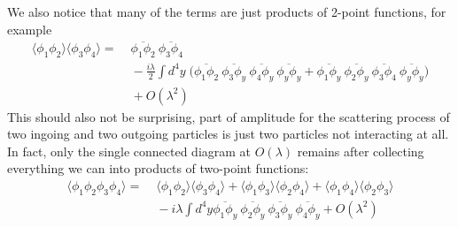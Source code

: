 \documentclass[12pt]{article}
\begin{document}
We also notice that many of the terms are just products of 2-point
functions, for example
\begin{equation}
  \begin{split}
    \langle \phi_1 \phi_2 \rangle  \langle \phi_3 \phi_4 \rangle 
    =&\;
    \overline{\phi_1\phi_2}~
    \overline{\phi_3\phi_4}
    \\ &\;
    - \frac{i\lambda}{2} \int d^4y\;
    \Big(
    \overline{\phi_1 \phi_2}~
    \overline{\phi_3 \phi_y}~
    \overline{\phi_4 \phi_y}~
    \overline{\phi_y \phi_y} 
    +
    \overline{\phi_1 \phi_y}~
    \overline{\phi_2 \phi_y}~
    \overline{\phi_3 \phi_4}~
    \overline{\phi_y \phi_y} 
    \Big)
    \\ &\;
    + O(\lambda^2)
 \end{split}
\end{equation}
This should also not be surprising, part of amplitude for the
scattering process of two ingoing and two outgoing particles is just
two particles not interacting at all. In fact, only the single
connected diagram at $O(\lambda)$ remains after collecting everything
we can into products of two-point functions:
\begin{equation}
  \begin{split}
    \langle \phi_1 \phi_2\phi_3 \phi_4 \rangle 
    =&\;
    \langle \phi_1 \phi_2 \rangle
    \langle \phi_3 \phi_4 \rangle +
    \langle \phi_1 \phi_3 \rangle
    \langle \phi_2 \phi_4 \rangle +
    \langle \phi_1 \phi_4 \rangle
    \langle \phi_2 \phi_3 \rangle
    \\ &\;
    - i \lambda \int d^4y
    \overline{\phi_1 \phi_y}~
    \overline{\phi_2 \phi_y}~
    \overline{\phi_3 \phi_y}~
    \overline{\phi_4 \phi_y} 
    + O(\lambda^2)
  \end{split}
\end{equation}
\end{document}
